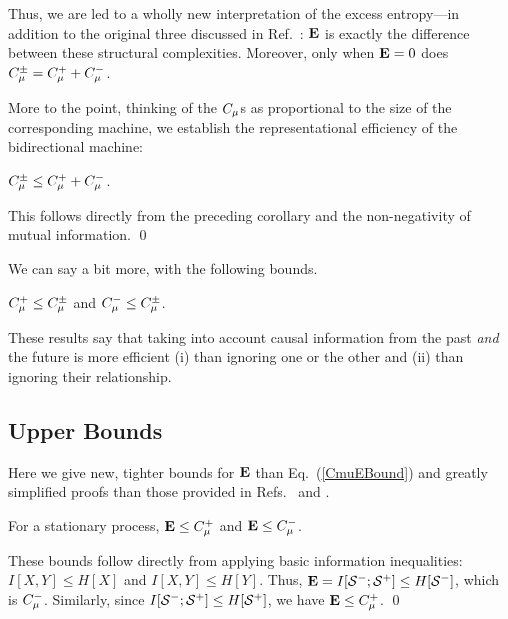 Thus, we are led to a wholly new interpretation of the excess entropy---in
addition to the original three discussed in Ref.~\cite{Crut01a}: ${\bf E}$ is
exactly the difference between these structural complexities. Moreover,
only when \mbox{${\bf E} = 0$} does $C_\mu^{\pm} = C_\mu^{+} + C_\mu^{-}$.

More to the point, thinking of the $C_\mu$s as proportional to the size of the
corresponding machine, we establish the representational efficiency of the
bidirectional machine:
\begin{Prop}
$C_\mu^{\pm} \leq C_\mu^{+} + C_\mu^{-}$.
\end{Prop}

\begin{ProProp}
This follows directly from the preceding corollary and the non-negativity of
mutual information.
\qed
\end{ProProp}

We can say a bit more, with the following bounds.

\begin{Cor}
$C_\mu^{+} \leq C_\mu^{\pm}$ and $C_\mu^{-} \leq C_\mu^{\pm}$.
\end{Cor}

These results say that taking into account causal information from the
past \emph{and} the future is more efficient (i) than ignoring one or the
other and (ii) than ignoring their relationship.

\subsection{Upper Bounds}

Here we give new, tighter bounds for ${\bf E}$ than Eq.~(\ref{CmuEBound}) and
greatly simplified proofs than those provided in Refs.~\cite{Crut98d} and
\cite{Shal98a}.

\begin{Prop}
For a stationary process, ${\bf E} \leq C_\mu^{+}$ and ${\bf E} \leq C_\mu^{-}$.
\end{Prop}

\begin{ProProp}
These bounds follow directly from applying basic information inequalities:
$I[X,Y] \leq H[X]$ and $I[X,Y] \leq H[Y]$.
Thus, ${\bf E} = I[{\mathcal{S}}^{-};{\mathcal{S}}^{+}] \leq
H[{\mathcal{S}}^{-}]$, which is $C_\mu^{-}$. Similarly, since
$I[{\mathcal{S}}^{-};{\mathcal{S}}^{+}] \leq 
H[{\mathcal{S}}^{+}]$, we have ${\bf E} \leq C_\mu^{+}$.
\qed
\end{ProProp}

